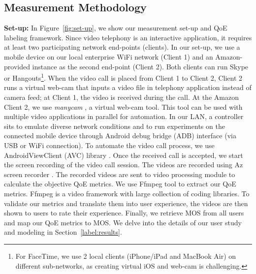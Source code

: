 \subsection{Measurement Methodology}

\noindent \textbf{Set-up:} 
In Figure~\ref{fig:set-up}, we show our measurement set-up and QoE labeling framework. 
Since video telephony is an interactive application, it requires at least two participating network end-points (clients). In our set-up, we use a mobile device on our local enterprise WiFi network (Client 1) and an Amazon-provided instance as the second end-point (Client 2). Both clients can run Skype or Hangouts\footnote{For FaceTime, we use 2 local clients (iPhone/iPad and MacBook Air) on different sub-networks, as creating virtual iOS and web-cam is challenging.}. 
When the video call is placed from Client 1 to Client 2, Client 2 runs a virtual web-cam that inputs a video file in telephony application instead of camera feed; at Client 1, the video is received during the call.
At the Amazon Client 2, we use \textit{manycam} \cite{mancam}, a virtual web-cam tool. 
This tool can be used with multiple video applications in parallel for automation. 
In our LAN, a controller sits  to emulate diverse network conditions and to run experiments on the connected mobile device  through Android debug bridge (ADB) interface (via USB or WiFi connection). 
To automate the video call process, we use AndroidViewClient (AVC) library \cite{awc}.
Once the received call is accepted, we start the screen recording of the video call session.   The videos are recorded using Az screen recorder \cite{azscreen}. 
The recorded videos are sent to video processing module to calculate the objective QoE metrics. 
We use Ffmpeg \cite{ffmpeg} tool to extract our QoE metrics. Ffmpeg is a video framework with large collection of coding libraries. To validate our metrics and translate them into user experience, the videos are then shown to users to rate their experience. 
Finally, we retrieve MOS from all users and map our QoE metrics to MOS. We delve into the details of our user  study and modeling in Section~\ref{label:results}.


